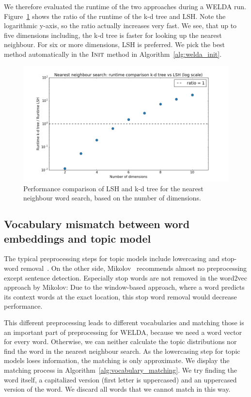 \documentclass[
        a4paper,
        titlepage,
        twoside,
        parskip
        ]{scrbook}
\theoremstyle{break}
\begin{document}
We therefore evaluated the runtime of the two approaches during a WELDA run.
Figure~\ref{fig:lsh_vs_kdtree} shows the ratio of the runtime of the k-d tree and LSH.
Note the logarithmic y-axis, so the ratio actually increases very fast.
We see, that up to five dimensions including, the k-d tree is faster for looking up the nearest neighbour.
For six or more dimensions, LSH is preferred.
We pick the best method automatically in the $\textsc{Init}$ method in Algorithm~\ref{alg:welda_init}.
\begin{figure}
       \centering
       \includegraphics[width=1.0\textwidth]{figures/lsh_vs_kdtree.png}
       \caption{Performance comparison of LSH and k-d tree for the nearest neighbour word search, based on the number of dimensions.}
       \label{fig:lsh_vs_kdtree}
\end{figure}

\subsection{Vocabulary mismatch between word embeddings and topic model}
\label{sec:vocabulary_mismatch}
The typical preprocessing steps for topic models include lowercasing and stop-word removal~\cite{Boyd-graber2014}.
On the other side, Mikolov~\cite{Mikolov2013d} recommends almost no preprocessing except sentence detection.
Especially stop words are not removed in the word2vec approach by Mikolov:
Due to the window-based approach, where a word predicts its context words at the exact location, this stop word removal would decrease performance.

This different preprocessing leads to different vocabularies and matching those is an important part of preprocessing for WELDA, because we need a word vector for every word.
Otherwise, we can neither calculate the topic distributions nor find the word in the nearest neighbour search.
As the lowercasing step for topic models loses information, the matching is only approximate.
We display the matching process in Algorithm~\ref{alg:vocabulary_matching}.
We try finding the word itself, a capitalized version (first letter is uppercased) and an uppercased version of the word.
We discard all words that we cannot match in this way.
\end{document}
